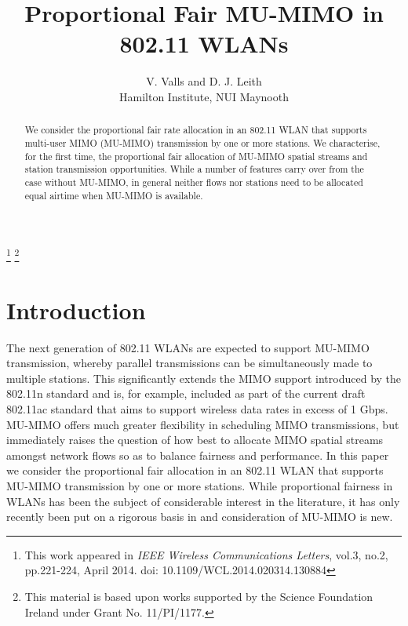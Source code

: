 \documentclass[11pt]{amsart}
\newenvironment{nouppercase}{\let\uppercase\relax \renewcommand{\uppercasenonmath}[1]{}}{}
\begin{document}
\title{Proportional Fair MU-MIMO in 802.11 WLANs}

\author{V. Valls and D. J. Leith\\Hamilton Institute, NUI Maynooth}
\thanks{This work appeared in \textit{IEEE Wireless Communications Letters}, vol.3, no.2, pp.221-224, April 2014. doi: 10.1109/WCL.2014.020314.130884}
\thanks{This material is based upon works supported by the Science Foundation Ireland under Grant No. 11/PI/1177.}
\begin{nouppercase}
\maketitle
\end{nouppercase}

\begin{abstract}
We consider the proportional fair rate allocation in an 802.11 WLAN that supports multi-user MIMO (MU-MIMO) transmission by one or more stations.   We characterise, for the first time, the proportional fair allocation of MU-MIMO spatial streams and station transmission opportunities.   While a number of features carry over from the case without MU-MIMO, in general neither flows nor stations need to be allocated equal airtime when MU-MIMO is available.
\end{abstract}




\section{Introduction}
 
The next generation of 802.11 WLANs are expected to support MU-MIMO transmission, whereby parallel transmissions can be simultaneously made to multiple stations.   This significantly extends the MIMO support introduced by the 802.11n standard and is, for example, included as part of the current draft 802.11ac standard that aims to support wireless data rates in excess of 1 Gbps.    MU-MIMO offers much greater flexibility in scheduling MIMO transmissions, but immediately raises the question of how best to allocate MIMO spatial streams amongst network flows so as to balance fairness and performance.  In this paper we consider the proportional fair allocation in an 802.11 WLAN that supports MU-MIMO transmission by one or more stations.    While proportional fairness \cite{Kelly:1998:0160-5682:237} in WLANs has been the subject of considerable interest in the literature, it has only recently been put on a rigorous basis in \cite{5910091} and consideration of MU-MIMO is new.
\end{document}
